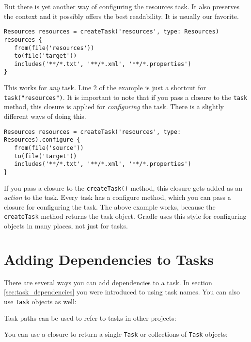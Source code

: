 But there is yet another way of configuring the resources task. It also preserves the context and it possibly offers the best readability. It is usually our favorite.
\begin{Verbatim}
Resources resources = createTask('resources', type: Resources)
resources {
   from(file('resources'))
   to(file('target'))
   includes('**/*.txt', '**/*.xml', '**/*.properties')
}
\end{Verbatim}
This works for \emph{any} task. Line 2 of the example is just a shortcut for \texttt{task("resources")}. It is important to note that if you pass a closure to the \texttt{task} method, this closure is applied for \emph{configuring} the task. There is a slightly different ways of doing this.
\begin{Verbatim}
Resources resources = createTask('resources', type: Resources).configure {
   from(file('source'))
   to(file('target'))
   includes('**/*.txt', '**/*.xml', '**/*.properties')
}	
\end{Verbatim}
If you pass a closure to the \texttt{createTask()} method, this closure gets added as an \emph{action} to the task. Every task has a configure method, which you can pass a closure for configuring the task. The above example works, because the \texttt{createTask} method returns the task object. Gradle uses this style for configuring objects in many places, not just for tasks.

\section{Adding Dependencies to Tasks}
\label{sec:adding_dependencies_to_tasks}
There are several ways you can add dependencies to a task. In section \ref{sec:task_dependencies} you were introduced to
using task names. You can also use \texttt{Task} objects as well:

Task paths can be used to refer to tasks in other projects:

You can use a closure to return a single \texttt{Task} or collections of \texttt{Task} objects:


